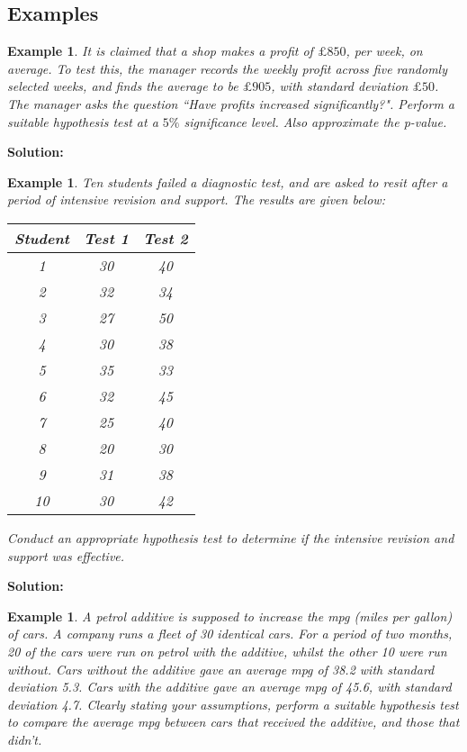 \documentclass[12pt]{article}
\theoremstyle{break}
\newtheorem{example}[theorem]{Example}
\begin{document}
\subsection{Examples}
\begin{example}
It is claimed that a shop makes a profit of $\pounds850$, per week, on average. To test this, the manager records the weekly profit across five randomly selected weeks, and finds the average to be $\pounds905$, with standard deviation $\pounds50$. The manager asks the question ``Have profits increased significantly?". Perform a suitable hypothesis test at a $5\%$ significance level. Also approximate the p-value.
\end{example}

\begin{mdframed}
\bf{Solution:}
\textcolor[rgb]{1.00,1.00,1.00}{\lipsum[1-4]}
\end{mdframed}

\begin{example}
Ten students failed a diagnostic test, and are asked to resit after a period of intensive revision and support. The results are given below:
\begin{center}
\begin{tabular}{|c|c|c|}
  \hline
  Student & Test 1 & Test 2 \\ \hline
  1 & 30 & 40 \\
  2 & 32 & 34 \\
  3 & 27 & 50 \\
  4 & 30 & 38 \\
  5 & 35 & 33 \\
  6 & 32 & 45 \\
  7 & 25 & 40 \\
  8 & 20 & 30 \\
  9 & 31 & 38 \\
  10 & 30 & 42 \\
  \hline
\end{tabular}
\end{center}
Conduct an appropriate hypothesis test to determine if the intensive revision and support was effective.
\end{example}

\begin{mdframed}
\bf{Solution:}
\textcolor[rgb]{1.00,1.00,1.00}{\lipsum[1-4]}
\end{mdframed}

\begin{example}
A petrol additive is supposed to increase the mpg (miles per gallon) of cars. A company runs a fleet of 30 identical cars. For a period of two months, 20 of the cars were run on petrol with the additive, whilst the other 10 were run without. Cars without the additive gave an average mpg of 38.2 with standard deviation 5.3. Cars with the additive gave an average mpg of 45.6, with standard deviation 4.7. Clearly stating your assumptions, perform a suitable hypothesis test to compare the average mpg between cars that received the additive, and those that didn't.
\end{example}
\end{document}
